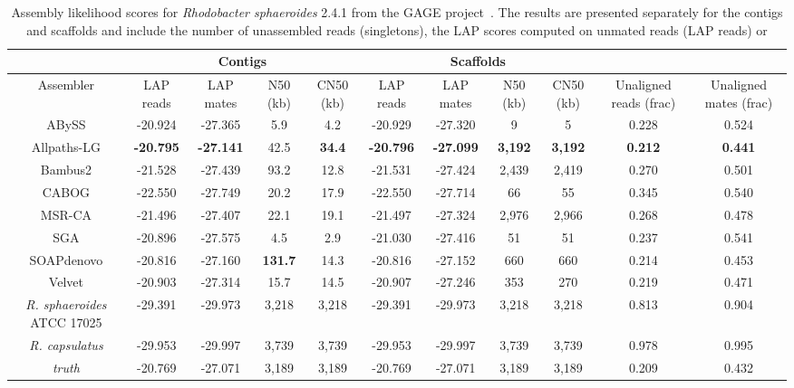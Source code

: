 \documentclass[12pt,\mydriver]{thesis}
\begin{document}
\begin{landscape}
\renewcommand{\baselinestretch}{1}
\small\normalsize
\begin{table}[tb!]
\centering
\tiny
\begin{tabular}{|c|c|c|c|c|c|c|c|c|c|c|}
\hline
 & \multicolumn{4}{c|}{Contigs} & \multicolumn{4}{c|}{Scaffolds} & & \\
\hline
Assembler & LAP reads & LAP mates & N50 (kb) & CN50 (kb) & LAP reads & LAP mates & N50 (kb) & CN50 (kb) & Unaligned reads (frac) & Unaligned mates (frac) \\
\hline
ABySS & -20.924 & -27.365 & 5.9 & 4.2 & -20.929 & -27.320 & 9 & 5 & 0.228 & 0.524\\
Allpaths-LG & {\bf -20.795} & {\bf -27.141} & 42.5 & {\bf 34.4} & {\bf -20.796} & {\bf -27.099} & {\bf 3,192} & {\bf 3,192} & {\bf 0.212} & {\bf 0.441} \\
Bambus2 & -21.528 & -27.439 & 93.2 & 12.8 & -21.531 & -27.424 & 2,439 & 2,419 & 0.270 & 0.501\\
CABOG & -22.550 & -27.749 & 20.2 & 17.9 & -22.550 & -27.714 & 66 & 55 & 0.345 & 0.540\\
MSR-CA & -21.496 & -27.407 & 22.1 & 19.1 & -21.497 & -27.324 & 2,976 & 2,966 & 0.268 & 0.478\\
SGA & -20.896 & -27.575 & 4.5 & 2.9 & -21.030 & -27.416 & 51 & 51 & 0.237 & 0.541 \\
SOAPdenovo & -20.816 & -27.160 & {\bf 131.7} & 14.3 & -20.816 & -27.152 & 660 & 660 & 0.214 & 0.453\\
Velvet & -20.903 & -27.314 & 15.7 & 14.5 & -20.907 & -27.246 & 353 & 270 & 0.219 & 0.471\\
\emph{R. sphaeroides} ATCC 17025 & -29.391 & -29.973 & 3,218 & 3,218 & -29.391 & -29.973 & 3,218 & 3,218 & 0.813 & 0.904\\
\emph{R. capsulatus} & -29.953 & -29.997 & 3,739 & 3,739 & -29.953 & -29.997 & 3,739 & 3,739 & 0.978 & 0.995\\
\emph{truth} & -20.769 & -27.071 & 3,189 & 3,189 & -20.769 & -27.071 & 3,189 & 3,189 & 0.209 & 0.432\\
\hline
\end{tabular}
\caption[\emph{Rhodobacter sphaeroides} 2.4.1 assembly evaluation]{Assembly likelihood scores for \emph{Rhodobacter sphaeroides} 2.4.1 from the GAGE project~\cite{earl2011assemblathon}.  The results are presented
separately for the contigs and scaffolds and include the number of
unassembled reads (singletons), the LAP scores computed on unmated reads (LAP reads) or
}
\end{table}
\end{landscape}
\end{document}
